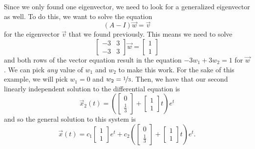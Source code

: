 \documentclass{ximera}
\begin{document}
\begin{exampleSol}
    Since we only found one eigenvector, we need to look for a generalized eigenvector as well. To do this, we want to solve the equation
    \begin{equation*}
        (A - I)\vec{w} = \vec{v}
    \end{equation*} 
    for the eigenvector $\vec{v}$ that we found previously. This means we need to solve
    \begin{equation*}
        \begin{bmatrix} 
            -3 & 3 \\ 
            -3 & 3 
        \end{bmatrix} 
        \vec{w} = 
        \begin{bmatrix} 
            1 \\ 
            1 
        \end{bmatrix}
    \end{equation*}
    and both rows of the vector equation result in the equation $-3w_1 + 3w_2 = 1$ for $\vec{w}$. We can pick \emph{any} value of $w_1$ and $w_2$ to make this work. For the sake of this example, we will pick $w_1 = 0$ and $w_2 = \nicefrac{1}{3}$. Then, we have that our second linearly independent solution to the differential equation is
    \begin{equation*}
        \vec{x}_2(t) = \left(
        \begin{bmatrix} 
            0 \\ 
            \frac{1}{3} 
        \end{bmatrix} + 
        \begin{bmatrix} 
            1 \\ 
            1 
        \end{bmatrix} 
        t \right) e^{t}
    \end{equation*}
    and so the general solution to this system is
    \begin{equation*}
        \vec{x}(t) = c_1 
        \begin{bmatrix} 
            1 \\ 
            1 
        \end{bmatrix} 
        e^t + c_2 \left(
        \begin{bmatrix} 
            0 \\ 
            \frac{1}{3} 
        \end{bmatrix} + 
        \begin{bmatrix} 
            1 \\ 
            1 
        \end{bmatrix} 
        t \right) e^{t}.
    \end{equation*}
    

\end{exampleSol}
\end{document}
